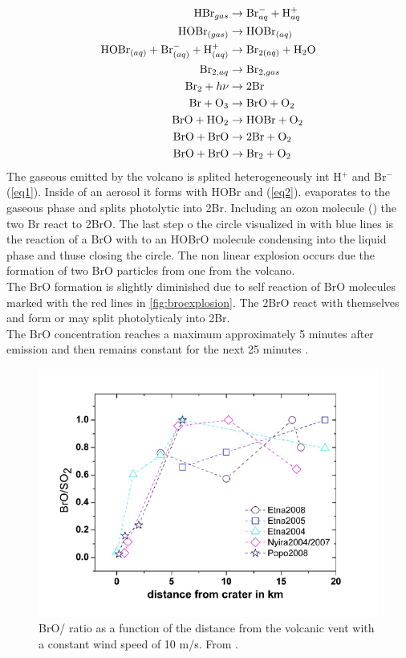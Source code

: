 \documentclass  [
  paper    = a4,
  BCOR     = 10mm,
  twoside,
  fontsize = 12pt,
  fleqn,
  toc      = bibnumbered,
  toc      = listofnumbered,
  numbers  = noendperiod,
  headings = normal,
  listof   = leveldown,
  version  = 3.03
]                                       {scrreprt}
\begin{document}
\begin{align}
\ce{HBr}_{gas} &\rightarrow \ce{Br}^{-}_{aq} + \ce{H}^{+}_{aq} \label{eq1}\\
\ce{HOBr}_{(gas)} &\rightarrow \ce{HOBr}_{(aq)} \\
\ce{HOBr}_{(aq)} + \ce{Br}^{-}_{(aq)} + \ce{H}^{+}_{(aq)} &\rightarrow
\ce{Br}_{2(aq)} +  \ce{H2O}\label{eq2}\\
\ce{Br}_{2,aq} &\rightarrow \ce{Br}_{2,gas} \\
\ce{Br2} + h\nu &\rightarrow 2 \ce{Br} \\
\ce{Br} + \ce{O3} &\rightarrow \ce{BrO} + \ce{O2} \\
\ce{BrO} + \ce{HO2} &\rightarrow \ce{HOBr} + \ce{O2} \\
\ce{BrO} + \ce{BrO} &\rightarrow 2 \ce{Br} + \ce{O2} \\
\ce{BrO} + \ce{BrO} &\rightarrow \ce{Br2} + \ce{O2}
\end{align}
The gaseous  emitted by the volcano is splited heterogeneously int H$^{+}$ and Br$^{-}$ (\cref{eq1}). Inside of an aerosol it forms with HOBr  and  (\cref{eq2}).  evaporates to the gaseous phase and splits photolytic  into 2Br. Including an ozon molecule () the two Br react to 2BrO. The last step o the circle visualized in  with blue lines is the reaction of a BrO with  to an HOBrO molecule condensing into the liquid phase  and thuse closing the circle. The non linear explosion occurs due the formation of two BrO particles from one  from the volcano.\\
The BrO formation is slightly diminished due to self reaction of BrO molecules marked with the red lines in \cref{fig:broexplosion}. The 2BrO react with themselves and form  or may split photolyticaly into 2Br.\\
The BrO concentration reaches a maximum approximately 5 minutes after emission and then remains constant for the next 25 minutes \citet{lubcke2014bro}.
 \begin{figure}
 	\centering
 	\includegraphics[width=0.7\linewidth]{Bilder/rat_diff}
 	\caption{BrO/ ratio as a function of the distance from the volcanic vent with a constant wind speed of 10 m/s. From \cite{lubcke2014optical}.}
 	\label{fig:ratdiff}
 \end{figure}
 
\end{document}
